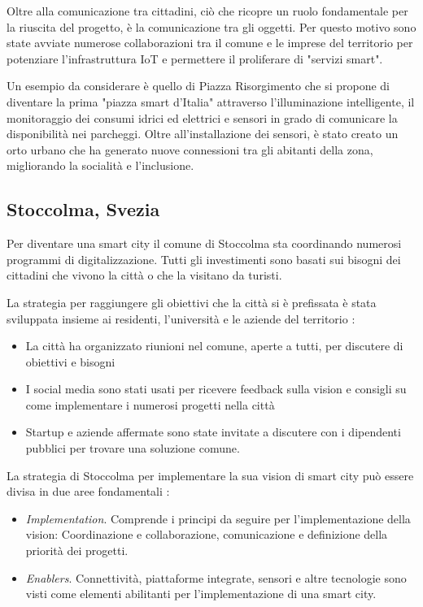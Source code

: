 Oltre alla comunicazione tra cittadini, ciò che ricopre un ruolo fondamentale per la riuscita del progetto, è la comunicazione tra gli oggetti. Per questo motivo sono state avviate numerose collaborazioni tra il comune e le imprese del territorio per potenziare l'infrastruttura IoT e permettere il proliferare di "servizi smart".

Un esempio da considerare è quello di Piazza Risorgimento che si propone di diventare la prima "piazza smart d'Italia" attraverso l'illuminazione intelligente, il monitoraggio dei consumi idrici ed elettrici e sensori in grado di comunicare la disponibilità nei parcheggi. Oltre all'installazione dei sensori, è stato creato un orto urbano che ha generato nuove connessioni tra gli abitanti della zona, migliorando la socialità e l'inclusione.

\subsection{Stoccolma, Svezia}
Per diventare una smart city il comune di Stoccolma sta coordinando numerosi programmi di digitalizzazione. Tutti gli investimenti sono basati sui bisogni dei cittadini che vivono la città o che la visitano da turisti.

La strategia per raggiungere gli obiettivi che la città si è prefissata è stata sviluppata insieme ai residenti, l'università e le aziende del territorio \cite{StockholmStrategy}:
\begin{itemize}
    \item La città ha organizzato riunioni nel comune, aperte a tutti, per discutere di obiettivi e bisogni
    \item I social media sono stati usati per ricevere feedback sulla vision e consigli su come implementare i numerosi progetti nella città
    \item Startup e aziende affermate sono state invitate a discutere con i dipendenti pubblici per trovare una soluzione comune.
\end{itemize}

La strategia di Stoccolma per implementare la sua vision di smart city può essere divisa in due aree fondamentali \cite{StockholmStrategy}:
\begin{itemize}
    \item \emph{Implementation}. Comprende i principi da seguire per l'implementazione della vision: Coordinazione e collaborazione, comunicazione e definizione della priorità dei progetti.
    \item \emph{Enablers}. Connettività, piattaforme integrate, sensori e altre tecnologie sono visti come elementi abilitanti per l'implementazione di una smart city.
\end{itemize}

